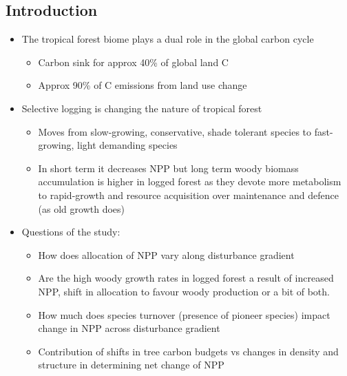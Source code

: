 \subsection*{Introduction}
\begin{itemize}
	\item The tropical forest biome plays a dual role in the global carbon cycle
	\begin{itemize}
		\item Carbon sink for approx 40\% of global land C
		\item Approx 90\% of C emissions from land use change
	\end{itemize}
	\item Selective logging is changing the nature of tropical forest
	\begin{itemize}
		\item Moves from slow-growing, conservative, shade tolerant species to fast-growing, light demanding species
		\item In short term it decreases NPP but long term woody biomass accumulation is higher in logged forest as they devote more metabolism to rapid-growth and resource acquisition over maintenance and defence (as old growth does) 
	\end{itemize}
	\item Questions of the study:
	\begin{itemize}
		\item How does allocation of NPP vary along disturbance gradient
		\item Are the high woody growth rates in logged forest a result of increased NPP, shift in allocation to favour woody production or a bit of both.
		\item How much does species turnover (presence of pioneer species) impact change in NPP across disturbance gradient
		\item Contribution of shifts in tree carbon budgets vs changes in density and structure in determining net change of NPP
	\end{itemize} 
\end{itemize}


